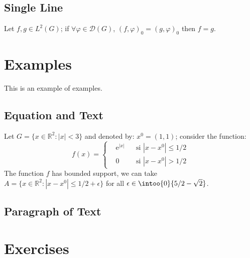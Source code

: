 \subsection{Single Line}

\begin{proposition} 
	Let $f,g\in L^2(G)$; if $\forall \varphi\in\mathcal{D}(G)$, $(f,\varphi)_0=(g,\varphi)_0$ then $f = g$. 
\end{proposition}


\section{Examples}

This is an example of examples.

\subsection{Equation and Text}

\begin{example}
	Let $G=\{x\in\mathbb{R}^2:|x|<3\}$ and denoted by: $x^0=(1,1)$; consider the function:
	\begin{equation}
		f(x)=\left\{\begin{aligned} & \mathrm{e}^{|x|} & & \text{si $|x-x^0|\leq 1/2$}\\
			& 0 & & \text{si $|x-x^0|> 1/2$}\end{aligned}\right.
	\end{equation}
	The function $f$ has bounded support, we can take $A=\{x\in\mathbb{R}^2:|x-x^0|\leq 1/2+\epsilon\}$ for all $\epsilon\in\intoo{0}{5/2-\sqrt{2}}$.
\end{example}

\subsection{Paragraph of Text}

\begin{example}
	\lipsum[2]
\end{example}


\section{Exercises}

